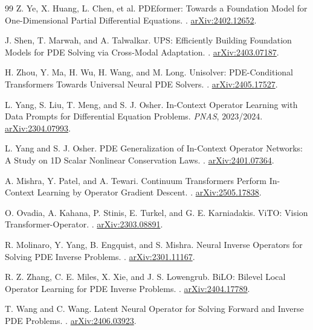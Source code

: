 \documentclass[11pt,a4paper]{article}
\begin{document}
\begin{thebibliography}{99}
Z. Ye, X. Huang, L. Chen, et al.
\newblock PDEformer: Towards a Foundation Model for One-Dimensional Partial Differential Equations.
. \href{https://arxiv.org/abs/2402.12652}{arXiv:2402.12652}.

J. Shen, T. Marwah, and A. Talwalkar.
\newblock UPS: Efficiently Building Foundation Models for PDE Solving via Cross-Modal Adaptation.
. \href{https://arxiv.org/abs/2403.07187}{arXiv:2403.07187}.

H. Zhou, Y. Ma, H. Wu, H. Wang, and M. Long.
\newblock Unisolver: PDE-Conditional Transformers Towards Universal Neural PDE Solvers.
. \href{https://arxiv.org/abs/2405.17527}{arXiv:2405.17527}.

L. Yang, S. Liu, T. Meng, and S. J. Osher.
\newblock In-Context Operator Learning with Data Prompts for Differential Equation Problems.
\newblock \emph{PNAS}, 2023/2024. \href{https://arxiv.org/abs/2304.07993}{arXiv:2304.07993}.

L. Yang and S. J. Osher.
\newblock PDE Generalization of In-Context Operator Networks: A Study on 1D Scalar Nonlinear Conservation Laws.
. \href{https://arxiv.org/abs/2401.07364}{arXiv:2401.07364}.

A. Mishra, Y. Patel, and A. Tewari.
\newblock Continuum Transformers Perform In-Context Learning by Operator Gradient Descent.
. \href{https://arxiv.org/abs/2505.17838}{arXiv:2505.17838}.

O. Ovadia, A. Kahana, P. Stinis, E. Turkel, and G. E. Karniadakis.
\newblock ViTO: Vision Transformer-Operator.
. \href{https://arxiv.org/abs/2303.08891}{arXiv:2303.08891}.

R. Molinaro, Y. Yang, B. Engquist, and S. Mishra.
\newblock Neural Inverse Operators for Solving PDE Inverse Problems.
. \href{https://arxiv.org/abs/2301.11167}{arXiv:2301.11167}.

R. Z. Zhang, C. E. Miles, X. Xie, and J. S. Lowengrub.
\newblock BiLO: Bilevel Local Operator Learning for PDE Inverse Problems.
. \href{https://arxiv.org/abs/2404.17789}{arXiv:2404.17789}.

T. Wang and C. Wang.
\newblock Latent Neural Operator for Solving Forward and Inverse PDE Problems.
. \href{https://arxiv.org/abs/2406.03923}{arXiv:2406.03923}.


\end{thebibliography}
\end{document}
